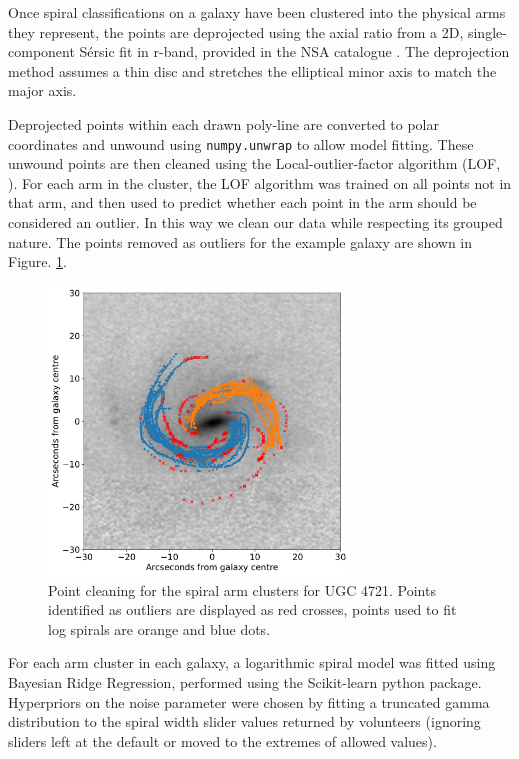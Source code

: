 \documentclass[../main.tex]{subfiles}
\begin{document}
Once spiral classifications on a galaxy have been clustered into the physical arms they represent, the points are deprojected using the axial ratio from a 2D, single-component S\'ersic fit in r-band, provided in the NSA catalogue \citep{2011AJ....142...31B}. The deprojection method assumes a thin disc and stretches the elliptical minor axis to match the major axis.

Deprojected points within each drawn poly-line are converted to polar coordinates and unwound using \texttt{numpy.unwrap} to allow model fitting. These unwound points are then cleaned using the Local-outlier-factor algorithm (LOF, \citealt{local-outlier-factor}). For each arm in the cluster, the LOF algorithm was trained on all points not in that arm, and then used to predict whether each point in the arm should be considered an outlier. In this way we clean our data while respecting its grouped nature. The points removed as outliers for the example galaxy are shown in Figure. \ref{fig:LOF_cleaning}.

\begin{figure}
  \includegraphics[width=8cm]{images__method/LOF_cleaning.pdf}
  \caption{Point cleaning for the spiral arm clusters for UGC 4721. Points identified as outliers are displayed as red crosses, points used to fit log spirals are orange and blue dots.}
  \label{fig:LOF_cleaning}
\end{figure}

For each arm cluster in each galaxy, a logarithmic spiral model was fitted using Bayesian Ridge Regression, performed using the Scikit-learn python package. Hyperpriors on the noise parameter were chosen by fitting a truncated gamma distribution to the spiral width slider values returned by volunteers (ignoring sliders left at the default or moved to the extremes of allowed values).
\end{document}
